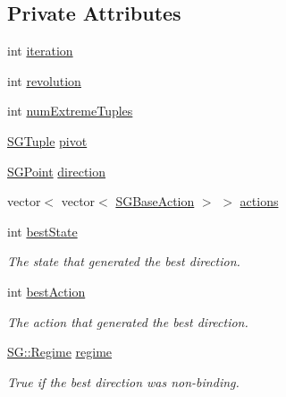 \subsection*{Private Attributes}
\begin{DoxyCompactItemize}
\item 
int \hyperlink{classSGIteration_a44a4f9e3cb074181292ae816b2c28d9e}{iteration}
\item 
int \hyperlink{classSGIteration_a21cc5c4fc7c40ff444ac7e3743c13940}{revolution}
\item 
int \hyperlink{classSGIteration_a14ecfb94b3111911d9b0ef545f72e88d}{num\+Extreme\+Tuples}
\item 
\hyperlink{classSGTuple}{S\+G\+Tuple} \hyperlink{classSGIteration_abdae7d336968af3515e7d9590cbcc46d}{pivot}
\item 
\hyperlink{classSGPoint}{S\+G\+Point} \hyperlink{classSGIteration_ac35e7e3049cd60c695a366cb8f75db37}{direction}
\item 
vector$<$ vector$<$ \hyperlink{classSGBaseAction}{S\+G\+Base\+Action} $>$ $>$ \hyperlink{classSGIteration_a5b5fcd6440b8dbcc6a8ded9f81699337}{actions}
\item 
\mbox{\label{classSGIteration_a16f16d027bab6baffeee1f4cadb3ce8f}} 
int \hyperlink{classSGIteration_a16f16d027bab6baffeee1f4cadb3ce8f}{best\+State}
\begin{DoxyCompactList}\small\item\em The state that generated the best direction. \end{DoxyCompactList}\item 
\mbox{\label{classSGIteration_a71c4414688b49fe6205fe8d90febd5b5}} 
int \hyperlink{classSGIteration_a71c4414688b49fe6205fe8d90febd5b5}{best\+Action}
\begin{DoxyCompactList}\small\item\em The action that generated the best direction. \end{DoxyCompactList}\item 
\mbox{\label{classSGIteration_a0dae9bbd62ac96335698290c2866efc8}} 
\hyperlink{namespaceSG_a139e4dec41ea0f38aae1f93f60cfff60}{S\+G\+::\+Regime} \hyperlink{classSGIteration_a0dae9bbd62ac96335698290c2866efc8}{regime}
\begin{DoxyCompactList}\small\item\em True if the best direction was non-\/binding. \end{DoxyCompactList}\item 

\end{DoxyCompactItemize}
